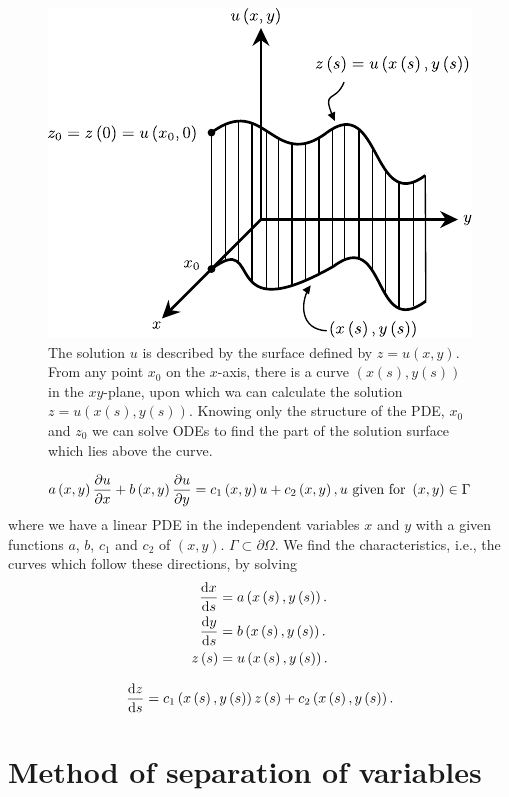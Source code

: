 \begin{figure}[ht!]
	\centering
	\includegraphics[width=0.35\paperwidth]{characteristics}
	\caption{The solution $u$ is described by the surface defined by
		$z=u\left(x,y\right)$.
		From any point $x_{0}$ on the $x$-axis, there is a curve
		$\left(x\left(s\right),y\left(s\right)\right)$ in the
		$xy$-plane, upon which wa can calculate the solution
		$z=u\left(x\left(s\right),y\left(s\right)\right)$.
		Knowing only the structure of the PDE, $x_{0}$ and $z_{0}$ we
		can solve ODEs to find the part of the solution surface which
		lies above the curve.}
\end{figure}

\begin{equation*}
	a\left(x,y\right)\diffp{u}{x}+
	b\left(x,y\right)\diffp{u}{y}=
	c_{1}\left(x,y\right)u+
	c_{2}\left(x,y\right),
	u\text{ given for }\left(x,y\right)\in\Gamma
\end{equation*}
where we have a linear PDE in the independent variables $x$ and $y$
with a given functions $a$, $b$, $c_{1}$ and $c_{2}$ of $\left(x,y\right)$.
$\Gamma\subset\partial\Omega$.
We find the characteristics, i.e., the curves which follow these directions, by solving
\begin{align*}
	\diff{x}{s}     & =
	a\left(x\left(s\right),y\left(s\right)\right). \\
	\diff{y}{s}     & =
	b\left(x\left(s\right),y\left(s\right)\right). \\
	z\left(s\right) & =
	u\left(x\left(s\right),y\left(s\right)\right).
\end{align*}

\begin{equation*}
	\diff{z}{s}=
	c_{1}\left(x\left(s\right),y\left(s\right)\right)
	z\left(s\right)+
	c_{2}\left(x\left(s\right),y\left(s\right)\right).
\end{equation*}

\section{Method of separation of variables}
